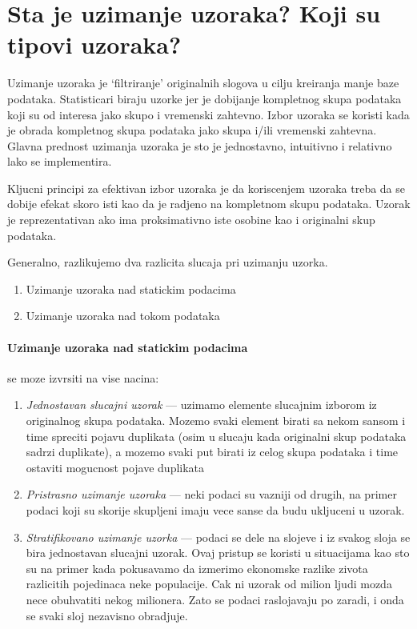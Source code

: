 \documentclass[a4paper]{article}
\begin{document}
\section{Sta je uzimanje uzoraka? Koji su tipovi uzoraka?}
Uzimanje uzoraka je `filtriranje' originalnih slogova u cilju kreiranja manje baze podataka.
Statisticari biraju uzorke jer je dobijanje kompletnog skupa podataka koji su od interesa jako skupo
i vremenski zahtevno. Izbor uzoraka se koristi kada je obrada kompletnog skupa podataka jako skupa
i/ili vremenski zahtevna.  Glavna prednost uzimanja uzoraka je sto je jednostavno, intuitivno i
relativno lako se implementira.

Kljucni principi za efektivan izbor uzoraka je da koriscenjem uzoraka treba da se dobije efekat
skoro isti kao da je radjeno na kompletnom skupu podataka. Uzorak je reprezentativan ako ima
proksimativno iste osobine kao i originalni skup podataka.

Generalno, razlikujemo dva razlicita slucaja pri uzimanju uzorka.
\begin{enumerate}
    \item Uzimanje uzoraka nad statickim podacima
    \item Uzimanje uzoraka nad tokom podataka
\end{enumerate}

\paragraph{Uzimanje uzoraka nad statickim podacima} se moze izvrsiti na vise nacina:
\begin{enumerate}
    \item \emph{Jednostavan slucajni uzorak } --- uzimamo elemente slucajnim izborom iz originalnog skupa
        podataka. Mozemo svaki element birati sa nekom sansom i time spreciti pojavu duplikata (osim
        u slucaju kada originalni skup podataka sadrzi duplikate), a mozemo svaki put birati iz
        celog skupa podataka i time ostaviti mogucnost pojave duplikata
    \item \emph{Pristrasno uzimanje uzoraka} --- neki podaci su vazniji od drugih, na primer podaci
        koji su skorije skupljeni imaju vece sanse da budu ukljuceni u uzorak.
    \item \emph{Stratifikovano uzimanje uzorka} --- podaci se dele na slojeve i iz svakog sloja se
        bira jednostavan slucajni uzorak. Ovaj pristup se koristi u situacijama kao sto su na primer
        kada pokusavamo da izmerimo ekonomske razlike zivota razlicitih pojedinaca neke populacije.
        Cak ni uzorak od milion ljudi mozda nece obuhvatiti nekog milionera. Zato se podaci
        raslojavaju po zaradi, i onda se svaki sloj nezavisno obradjuje.
\end{enumerate}
\end{document}
